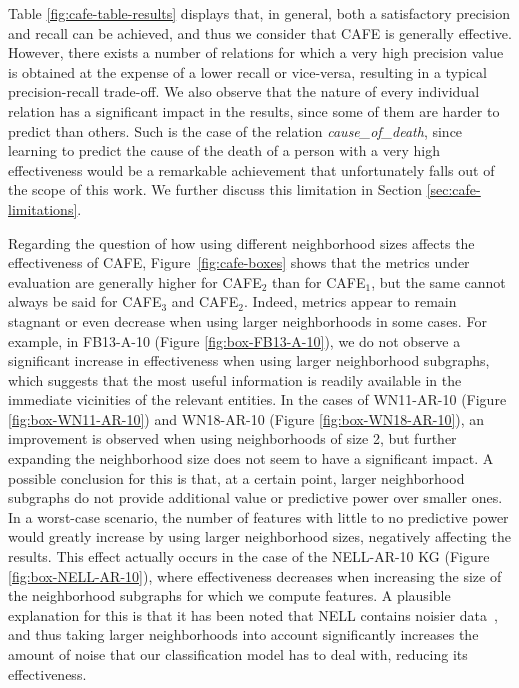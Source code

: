     

\newpage

Table \ref{fig:cafe-table-results} displays that, in general, both a satisfactory precision and recall can be achieved, and thus we consider that CAFE is generally effective. However, there exists a number of relations for which a very high precision value is obtained at the expense of a lower recall or vice-versa, resulting in a typical precision-recall trade-off. We also observe that the nature of every individual relation has a significant impact in the results, since some of them are harder to predict than others. Such is the case of the relation \textit{cause\_of\_death}, since learning to predict the cause of the death of a person with a very high effectiveness would be a remarkable achievement that unfortunately falls out of the scope of this work. We further discuss this limitation in Section \ref{sec:cafe-limitations}.

Regarding the question of how using different neighborhood sizes affects the effectiveness of CAFE, Figure~\ref{fig:cafe-boxes} shows that the metrics under evaluation are generally higher for CAFE$_2$ than for CAFE$_1$, but the same cannot always be said for CAFE$_3$ and CAFE$_2$. Indeed, metrics appear to remain stagnant or even decrease when using larger neighborhoods in some cases. For example, in FB13-A-10 (Figure \ref{fig:box-FB13-A-10}), we do not observe a significant increase in effectiveness when using larger neighborhood subgraphs, which suggests that the most useful information is readily available in the immediate vicinities of the relevant entities. In the cases of WN11-AR-10 (Figure \ref{fig:box-WN11-AR-10}) and WN18-AR-10 (Figure \ref{fig:box-WN18-AR-10}), an improvement is observed when using neighborhoods of size 2, but further expanding the neighborhood size does not seem to have a significant impact. A possible conclusion for this is that, at a certain point, larger neighborhood subgraphs do not provide additional value or predictive power over smaller ones. In a worst-case scenario, the number of features with little to no predictive power would greatly increase by using larger neighborhood sizes, negatively affecting the results. This effect actually occurs in the case of the NELL-AR-10 KG (Figure \ref{fig:box-NELL-AR-10}), where effectiveness decreases when increasing the size of the neighborhood subgraphs for which we compute features. A plausible explanation for this is that it has been noted that NELL contains noisier data~\cite{paulheim2014}, and thus taking larger neighborhoods into account significantly increases the amount of noise that our classification model has to deal with, reducing its effectiveness.

